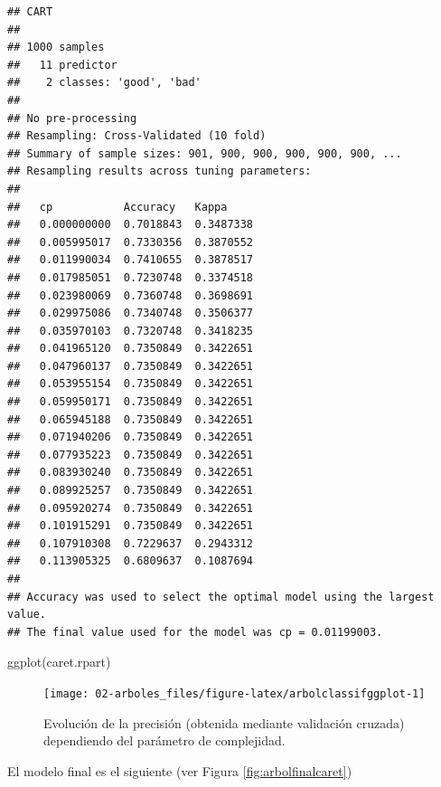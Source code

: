\documentclass[
  spanish,
]{book}
\newenvironment{Shaded}{\begin{snugshade}}{\end{snugshade}}
\newcommand{\FunctionTok}[1]{\textcolor[rgb]{0.00,0.00,0.00}{#1}}
\newcommand{\NormalTok}[1]{#1}
\newcommand{\SpecialCharTok}[1]{\textcolor[rgb]{0.00,0.00,0.00}{#1}}
\theoremstyle{break}
\theoremstyle{definition}
\theoremstyle{definition}
\theoremstyle{definition}
\theoremstyle{definition}
\theoremstyle{remark}
\begin{document}
\begin{verbatim}
## CART 
## 
## 1000 samples
##   11 predictor
##    2 classes: 'good', 'bad' 
## 
## No pre-processing
## Resampling: Cross-Validated (10 fold) 
## Summary of sample sizes: 901, 900, 900, 900, 900, 900, ... 
## Resampling results across tuning parameters:
## 
##   cp           Accuracy   Kappa    
##   0.000000000  0.7018843  0.3487338
##   0.005995017  0.7330356  0.3870552
##   0.011990034  0.7410655  0.3878517
##   0.017985051  0.7230748  0.3374518
##   0.023980069  0.7360748  0.3698691
##   0.029975086  0.7340748  0.3506377
##   0.035970103  0.7320748  0.3418235
##   0.041965120  0.7350849  0.3422651
##   0.047960137  0.7350849  0.3422651
##   0.053955154  0.7350849  0.3422651
##   0.059950171  0.7350849  0.3422651
##   0.065945188  0.7350849  0.3422651
##   0.071940206  0.7350849  0.3422651
##   0.077935223  0.7350849  0.3422651
##   0.083930240  0.7350849  0.3422651
##   0.089925257  0.7350849  0.3422651
##   0.095920274  0.7350849  0.3422651
##   0.101915291  0.7350849  0.3422651
##   0.107910308  0.7229637  0.2943312
##   0.113905325  0.6809637  0.1087694
## 
## Accuracy was used to select the optimal model using the largest value.
## The final value used for the model was cp = 0.01199003.
\end{verbatim}

\begin{Shaded}
\begin{Highlighting}[]
\FunctionTok{ggplot}\NormalTok{(caret.rpart)}
\end{Highlighting}
\end{Shaded}

\begin{figure}[!htb]

{\centering \texttt{[image: 02-arboles\_files/figure-latex/arbolclassifggplot-1]} 

}

\caption{Evolución de la precisión (obtenida mediante validación cruzada) dependiendo del parámetro de complejidad.}\label{fig:arbolclassifggplot}
\end{figure}

El modelo final es el siguiente (ver Figura \ref{fig:arbolfinalcaret})

\begin{Shaded}
\end{Shaded}
\end{document}
